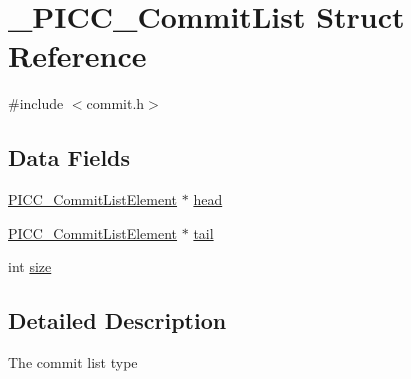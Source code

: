 \hypertarget{struct__PICC__CommitList}{\section{\-\_\-\-P\-I\-C\-C\-\_\-\-Commit\-List Struct Reference}
\label{struct__PICC__CommitList}
}


{\ttfamily \#include $<$commit.\-h$>$}

\subsection*{Data Fields}
{\bf }\par
\begin{DoxyCompactItemize}
\item 
\hyperlink{commit_8h_ab8090c3a82dc75b4dea9bb9015a95f71}{P\-I\-C\-C\-\_\-\-Commit\-List\-Element} $\ast$ \hyperlink{struct__PICC__CommitList_a1e6220d188b828adf2e1833e638196b3}{head}
\item 
\hyperlink{commit_8h_ab8090c3a82dc75b4dea9bb9015a95f71}{P\-I\-C\-C\-\_\-\-Commit\-List\-Element} $\ast$ \hyperlink{struct__PICC__CommitList_ace35f17402f08d1ea9e8fa45c6f7f562}{tail}
\item 
int \hyperlink{struct__PICC__CommitList_a5eb47c6882e4462d638224d54686f7e0}{size}
\end{DoxyCompactItemize}



\subsection{Detailed Description}
The commit list type 

